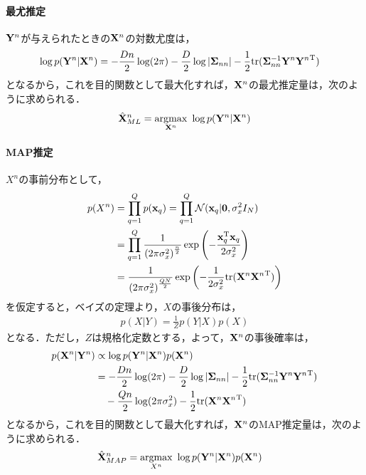 \documentclass[11pt,a4j]{article}
\begin{document}
        \paragraph{最尤推定}
          ${\bf Y}^n$が与えられたときの${\bf X}^n$の対数尤度は，
          \begin{align}
            \log p({\bf Y}^n|{\bf X}^n)
            &= -\frac{Dn}{2} \log (2 \pi) - \frac{D}{2} \log |{\bf \Sigma}_{nn}| - \frac{1}{2} {\rm tr} ({\bf \Sigma}_{nn}^{-1} {{\bf Y}^n}{{\bf Y}^n}^{\mathrm{T}})
          \end{align}
          となるから，これを目的関数として最大化すれば，${\bf X}^n$の最尤推定量は，次のように求められる．
          \begin{align}
            \hat{\bf X}^{n}_{ML} &= \underset{{\bf X}^n}{\rm argmax} ~ \log p( {\bf Y}^n | {\bf X}^n) \\
          \end{align}

        \paragraph{MAP推定}
          $X^n$の事前分布として，
          \begin{align}
            p(X^n) 
            &= \prod_{q=1}^{Q} p({\bf x}_q) = \prod_{q=1}^{Q} \mathcal{N}({\bf x}_q | {\bf 0}, \sigma_x^2 I_N) \\
            &= \prod_{q=1}^{Q} \frac{1}{{(2 \pi {\sigma_x^2} )}^{\frac{n}{2}}} \exp \left( - \frac{ {\bf x}_q^{\mathrm{T}} {\bf x}_q }{2 \sigma_x^2} \right) \\
            &= \frac{1}{{(2 \pi {\sigma_x^2} )}^{\frac{QN}{2}}} \exp \left( -\frac{1}{2 \sigma_x^2} {\rm tr} ({{\bf X}^n}{{\bf X}^n}^{\mathrm{T}}) \right) \\
          \end{align}
          を仮定すると，ベイズの定理より，$X$の事後分布は，
          \begin{align}
            p(X|Y) = \frac{1}{Z} p(Y|X)p(X)
          \end{align}
          となる．ただし，$Z$は規格化定数とする，よって，${\bf X}^n$の事後確率は，
          \begin{align}
            p({\bf X}^n|{\bf Y}^n) 
            &\propto \log p({\bf Y}^n | {\bf X}^n) p({\bf X}^n) \\
            &= -\frac{Dn}{2} \log (2 \pi) - \frac{D}{2} \log |{\bf \Sigma}_{nn}| - \frac{1}{2} {\rm tr} ({\bf \Sigma}_{nn}^{-1} {{\bf Y}^n}{{\bf Y}^n}^{\mathrm{T}}) \\
            &\hspace{1em} -\frac{Qn}{2} \log (2 \pi \sigma_x^2) - \frac{1}{2} {\rm tr} ({{\bf X}^n}{{\bf X}^n}^{\mathrm{T}})
          \end{align}
          となるから，これを目的関数として最大化すれば，${\bf X}^n$のMAP推定量は，次のように求められる．
          \begin{align}
            \hat{\bf X}^{n}_{MAP} &= \underset{X^n}{\rm argmax} ~ \log p({\bf Y}^n | {\bf X}^n) p({\bf X}^n) 
          \end{align}
\end{document}

